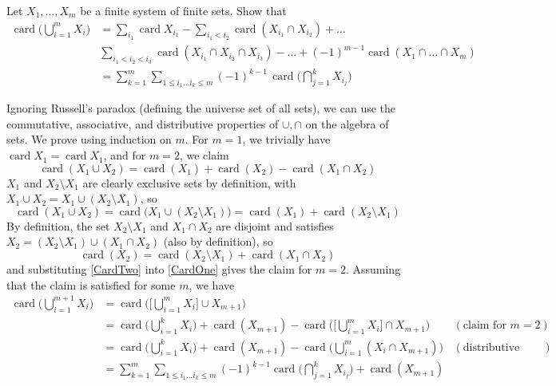 \documentclass{article}
\DeclareMathOperator{\card}{card}
\begin{document}
    \begin{exercise}[Zorich 2.4.6]
    Let $X_1, \ldots, X_m$ be a finite system of finite sets. Show that 
    \begin{align*}
        \card \bigg( \bigcup_{i=1}^m X_i \bigg) & = \sum_{i_1} \card{X_{i_1}} - \sum_{i_1 < i_2} \card(X_{i_1} \cap X_{i_2}) + \ldots \\
        & \sum_{i_1 < i_2 < i_3} \card(X_{i_1} \cap X_{i_2} \cap X_{i_3}) - \ldots + (-1)^{m-1} \card (X_1 \cap \ldots \cap X_m) \\
        & = \sum_{k=1}^{m} \sum_{1 \leq i_1 \ldots i_k \leq m} (-1)^{k-1} \, \card\bigg( \bigcap_{j=1}^k X_{i_j} \bigg)
    \end{align*}
    \end{exercise}

    \begin{solution}
    Ignoring Russell's paradox (defining the universe set of all sets), we can use the commutative, associative, and distributive properties of $\cup, \cap$ on the algebra of sets. We prove using induction on $m$. For $m=1$, we trivially have $\card{X_1} = \card{X_1}$, and for $m = 2$, we claim 
    \[\card( X_1 \cup X_2) = \card(X_1) + \card(X_2) - \card(X_1 \cap X_2)\]
    $X_1$ and $X_2 \setminus X_1$ are clearly exclusive sets by definition, with $X_1 \cup X_2 = X_1 \cup (X_2 \setminus X_1)$, so 
    \[\card(X_1 \cup X_2) = \card\big( X_1 \cup (X_2 \setminus X_1) \big) = \card(X_1) + \card(X_2 \setminus X_1) \tag{2} \label{CardOne}\]
    By definition, the set $X_2 \setminus X_1$ and $X_1 \cap X_2$ are disjoint and satisfies $X_2 = (X_2 \setminus X_1) \cup (X_1 \cap X_2)$ (also by definition), so 
    \[\card(X_2) = \card(X_2 \setminus X_1) + \card(X_1 \cap X_2) \tag{3} \label{CardTwo}\]
    and substituting \eqref{CardTwo} into \eqref{CardOne} gives the claim for $m=2$. Assuming that the claim is satisfied for some $m$, we have 
    \begin{align*}
        \card \bigg( \bigcup_{i=1}^{m+1} X_i \bigg) & = \card \bigg( \bigg[ \bigcup_{i=1}^m X_i \bigg] \cup X_{m+1} \bigg) & \\
        & = \card \bigg( \bigcup_{i=1}^k X_i \bigg) + \card(X_{m+1}) - \card\bigg( \bigg[ \bigcup_{i=1}^m X_i\bigg] \cap X_{m+1} \bigg) & (\text{claim for } m=2) \\
        & = \card \bigg( \bigcup_{i=1}^k X_i \bigg) + \card(X_{m+1}) - \card\bigg(\bigcup_{i=1}^m (X_i \cap X_{m+1}) \bigg) & (\text{distributive prop.})  \\
        & = \sum_{k=1}^m \sum_{1 \leq i_1 \ldots i_k \leq m} (-1)^{k-1} \card\bigg( \bigcap_{j=1}^k X_{i_j} \bigg) + \card(X_{m+1}) \\ 

\end{align*}
\end{solution}
\end{document}
